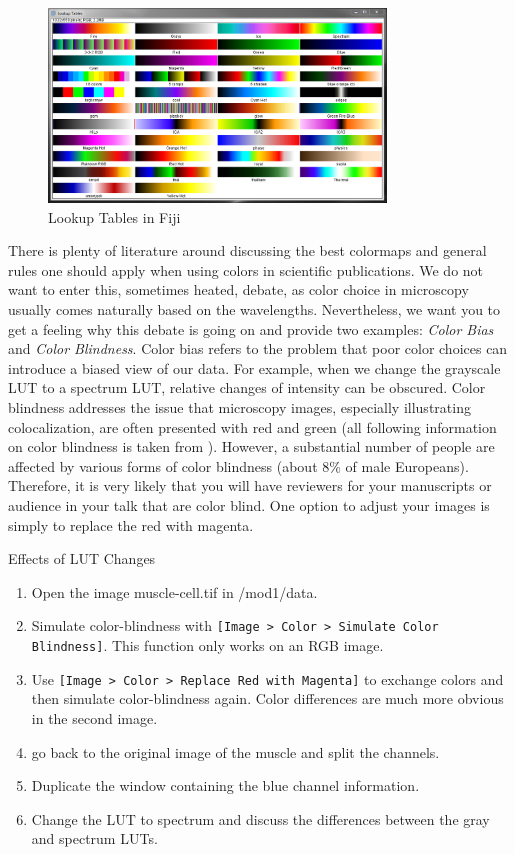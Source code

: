 \begin{figure}[!ht]
	\centering
		\includegraphics[width=0.80\textwidth]{mod1/figures/lookup-tables.png}
	\caption{Lookup Tables in Fiji}
	\label{fig:lookup-tables}
\end{figure}

There is plenty of literature around discussing the best colormaps and general rules one should apply when using colors in scientific publications. We do not want to enter this, sometimes heated, debate, as color choice in microscopy usually comes naturally based on the wavelengths. Nevertheless, we want you to get a feeling why this debate is going on and provide two examples: \emph{Color Bias} and \emph{Color Blindness}. Color bias refers to the problem that poor color choices can introduce a biased view of our data. For example, when we change the grayscale LUT to a spectrum LUT, relative changes of intensity can be obscured. Color blindness addresses the issue that microscopy images, especially illustrating colocalization, are often presented with red and green (all following information on color blindness is taken from \cite{wong2011}). However, a substantial number of people are affected by various forms of color blindness (about 8\% of male Europeans). Therefore, it is very likely that you will have reviewers for your manuscripts or audience in your talk that are color blind. One option to adjust your images is simply to replace the red with magenta.

\begin{taskbox}{Effects of LUT Changes}

\begin{enumerate}
	\item Open the image muscle-cell.tif in /mod1/data. 
	\item Simulate color-blindness with \texttt{[Image > Color > Simulate Color Blindness]}. This function only works on an RGB image. 
	\item Use \texttt{[Image > Color > Replace Red with Magenta]} to exchange colors and then simulate color-blindness again. Color differences are much more obvious in the second image.
	\item go back to the original image of the muscle and split the channels.
	\item Duplicate the window containing the blue channel information.
	\item Change the LUT to spectrum and discuss the differences between the gray and spectrum LUTs.
\end{enumerate}

\end{taskbox}

